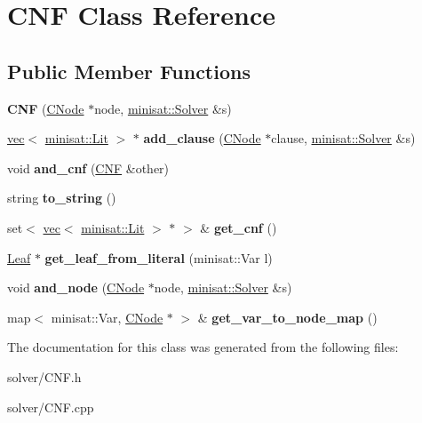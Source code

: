 \hypertarget{classCNF}{\section{\-C\-N\-F \-Class \-Reference}
\label{classCNF}
}
\subsection*{\-Public \-Member \-Functions}
\begin{DoxyCompactItemize}
\item 
\hypertarget{classCNF_abc6608d3e61a97f5a713ec79a2d5a78e}{{\bfseries \-C\-N\-F} (\hyperlink{classCNode}{\-C\-Node} $\ast$node, \hyperlink{classminisat_1_1Solver}{minisat\-::\-Solver} \&s)}\label{classCNF_abc6608d3e61a97f5a713ec79a2d5a78e}

\item 
\hypertarget{classCNF_a0716cf08ea2eca3bc713c1e1fe76cfc5}{\hyperlink{classvec}{vec}$<$ \hyperlink{classminisat_1_1Lit}{minisat\-::\-Lit} $>$ $\ast$ {\bfseries add\-\_\-clause} (\hyperlink{classCNode}{\-C\-Node} $\ast$clause, \hyperlink{classminisat_1_1Solver}{minisat\-::\-Solver} \&s)}\label{classCNF_a0716cf08ea2eca3bc713c1e1fe76cfc5}

\item 
\hypertarget{classCNF_ae0d4f72d022b070f57f1b2c252a61b58}{void {\bfseries and\-\_\-cnf} (\hyperlink{classCNF}{\-C\-N\-F} \&other)}\label{classCNF_ae0d4f72d022b070f57f1b2c252a61b58}

\item 
\hypertarget{classCNF_a2be099608573de21156b5dfc54042485}{string {\bfseries to\-\_\-string} ()}\label{classCNF_a2be099608573de21156b5dfc54042485}

\item 
\hypertarget{classCNF_aa353261cc8a24c6940787c662c18c7cd}{set$<$ \hyperlink{classvec}{vec}$<$ \hyperlink{classminisat_1_1Lit}{minisat\-::\-Lit} $>$ $\ast$ $>$ \& {\bfseries get\-\_\-cnf} ()}\label{classCNF_aa353261cc8a24c6940787c662c18c7cd}

\item 
\hypertarget{classCNF_aac7fc5db637bc524750a3ead50790085}{\hyperlink{classLeaf}{\-Leaf} $\ast$ {\bfseries get\-\_\-leaf\-\_\-from\-\_\-literal} (minisat\-::\-Var l)}\label{classCNF_aac7fc5db637bc524750a3ead50790085}

\item 
\hypertarget{classCNF_ae7ee11aa4cbfbf6d95a0ceb6877f6f79}{void {\bfseries and\-\_\-node} (\hyperlink{classCNode}{\-C\-Node} $\ast$node, \hyperlink{classminisat_1_1Solver}{minisat\-::\-Solver} \&s)}\label{classCNF_ae7ee11aa4cbfbf6d95a0ceb6877f6f79}

\item 
\hypertarget{classCNF_a29b94db8b9b26e870a0ee92a3890c80f}{map$<$ minisat\-::\-Var, \hyperlink{classCNode}{\-C\-Node} $\ast$ $>$ \& {\bfseries get\-\_\-var\-\_\-to\-\_\-node\-\_\-map} ()}\label{classCNF_a29b94db8b9b26e870a0ee92a3890c80f}

\end{DoxyCompactItemize}


\-The documentation for this class was generated from the following files\-:\begin{DoxyCompactItemize}
\item 
solver/\-C\-N\-F.\-h\item 
solver/\-C\-N\-F.\-cpp\end{DoxyCompactItemize}

